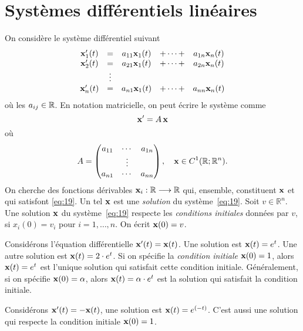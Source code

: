 \chapter{Systèmes différentiels linéaires}
\label{cha:syst-diff-line}

On considère le système différentiel suivant
\begin{equation}
  \label{eq:19}
  \begin{array}{ccccc}
    \mathbf{x}'_1(t) & = &a_{11}\mathbf{x}_1(t) & + \cdots + & a_{1n}\mathbf{x}_n(t) \\
    \mathbf{x}'_2(t) & = &a_{21}\mathbf{x}_1(t) & + \cdots + & a_{2n}\mathbf{x}_n(t) \\
            & \vdots \\             
    \mathbf{x}'_n(t) & = &a_{n1}\mathbf{x}_1(t) & + \cdots + & a_{nn}\mathbf{x}_n(t)
  \end{array}
\end{equation}
où les $a_{ij} \in \mathbb{R}$.  
En notation matricielle, on peut écrire le système comme
\begin{displaymath}
  \mathbf{x}' = A\,\mathbf{x}
\end{displaymath}
où 
\begin{displaymath}
  A =
  \begin{pmatrix}
    a_{11} & \cdots & a_{1n}\\
          & \vdots & \\
          a_{n1} & \cdots & a_{nn}\\          
  \end{pmatrix}, \quad \mathbf{x} \in C^{1}(\mathbb{R}; \mathbb{R}^{n}).
\end{displaymath}
%
On cherche des fonctions dérivables $\mathbf{x}_i: \mathbb{R} \longrightarrow \mathbb{R}$  qui, ensemble, constituent $\mathbf{x}$ et qui  satisfont \eqref{eq:19}. Un tel $\mathbf{x}$ est une \emph{solution} du système~\eqref{eq:19}.
Soit $v ∈ ℝ^n$.  Une solution  $\mathbf{x}$   du système~\eqref{eq:19} respecte les \emph{conditions initiales} données par $v$,  si $x_i(0) = v_i$ pour $i=1,\dots,n$. On écrit  $\mathbf{x}(0) = v $. 



\begin{example}
  \label{exe:49}
  Considérons l'équation différentielle $\mathbf{x}'(t) = \mathbf{x}(t)$. Une solution est $\mathbf{x}(t) = e^t$. Une autre solution est $\mathbf{x}(t) = 2\cdot e^t$. Si on spécifie la \emph{condition initiale} $\mathbf{x}(0) = 1$, alors $\mathbf{x}(t) = e^t$ est l'unique solution qui satisfait cette condition initiale. Généralement, si on spécifie $\mathbf{x}(0) = \alpha$, alors  $\mathbf{x}(t) = \alpha \cdot e^t$ est la solution qui satisfait la condition initiale. 

Considérons $\mathbf{x}'(t) = -\mathbf{x}(t)$, une solution est $\mathbf{x}(t) = e^{(-t)}$. %
C'est aussi une solution qui respecte la condition initiale $\mathbf{x}(0) = 1$. 
\end{example}

